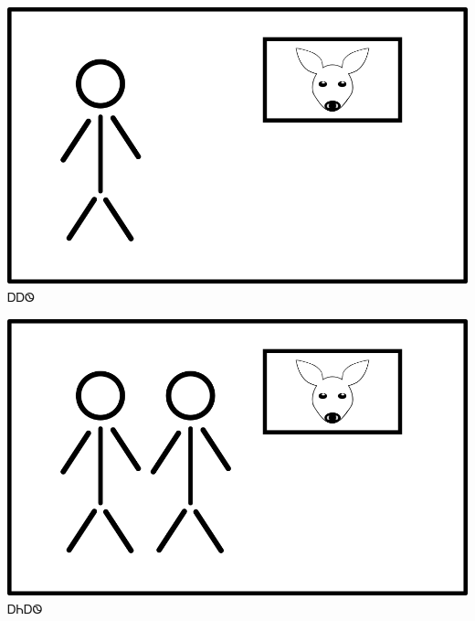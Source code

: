 \documentclass[avery8371]{flashcards}%
\begin{document}
    \begin{flashcard}{
        \includegraphics[width=0.95\columnwidth,height=.51\columnwidth,keepaspectratio]{../artwork/flags/aahwi-flag}
    }
        \Huge ᎠᎠᏫ
    \end{flashcard}
    \begin{flashcard}{
        \includegraphics[width=0.95\columnwidth,height=.51\columnwidth,keepaspectratio]{../artwork/flags/aniahwi-flag}
    }
        \Huge ᎠᏂᎠᏫ
    \end{flashcard}
\end{document}
